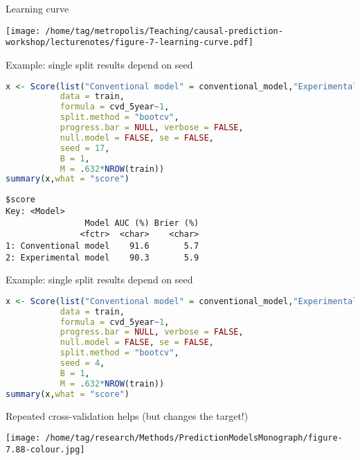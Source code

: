 \documentclass{beamer}\usepackage{listings}
\begin{document}
\begin{frame}[label={sec:org11a0a92}]{Learning curve}
\vspace{-3em}

\begin{center}
\texttt{[image: /home/tag/metropolis/Teaching/causal-prediction-workshop/lecturenotes/figure-7-learning-curve.pdf]}
\end{center}
\end{frame}
\begin{frame}[label={sec:org208a389},fragile]{Example: single split results depend on seed}
 \begin{lstlisting}[language=r,numbers=none,otherkeywords={seed,train,method,B,M}, deletekeywords={model,family,se,null,data,formula}]
x <- Score(list("Conventional model" = conventional_model,"Experimental model" = experimental_model),
           data = train,
           formula = cvd_5year~1,
           split.method = "bootcv",
           progress.bar = NULL, verbose = FALSE,
           null.model = FALSE, se = FALSE,
           seed = 17,
           B = 1,
           M = .632*NROW(train))
summary(x,what = "score")
\end{lstlisting}

\label{}
\begin{verbatim}
$score
Key: <Model>
                Model AUC (%) Brier (%)
               <fctr>  <char>    <char>
1: Conventional model    91.6       5.7
2: Experimental model    90.3       5.9
\end{verbatim}
\end{frame}
\begin{frame}[label={sec:orgdd6680a},fragile]{Example: single split results depend on seed}
 \begin{lstlisting}[language=r,numbers=none,otherkeywords={seed,train,method,B,M}, deletekeywords={model,family,se,null,data,formula}]
x <- Score(list("Conventional model" = conventional_model,"Experimental model" = experimental_model),
           data = train,
           formula = cvd_5year~1,
           progress.bar = NULL, verbose = FALSE,
           null.model = FALSE, se = FALSE,
           split.method = "bootcv",
           seed = 4,
           B = 1,
           M = .632*NROW(train))
summary(x,what = "score")
\end{lstlisting}
\end{frame}
\begin{frame}[label={sec:org2f088c1},shrink=25]{Repeated cross-validation helps (but changes the target!)}
\begin{center}
\texttt{[image: /home/tag/research/Methods/PredictionModelsMonograph/figure-7.88-colour.jpg]}
\end{center}
\end{frame}
\end{document}
